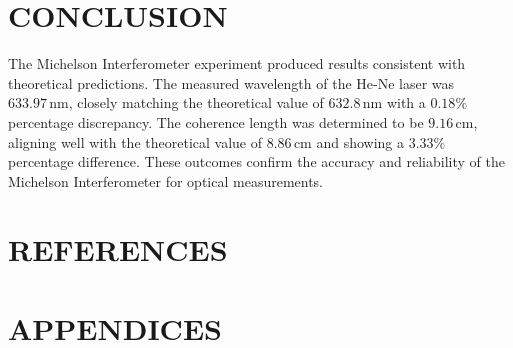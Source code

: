 \documentclass[a4paper,11pt]{article}
\begin{document}
\newpage
\section{\centering CONCLUSION}
\label{sec:CONCLUSION}
\indent 

The Michelson Interferometer experiment produced results consistent with theoretical predictions. The measured wavelength of the He-Ne laser was \( 633.97 \, \text{nm} \), closely matching the theoretical value of \( 632.8 \, \text{nm} \) with a \( 0.18\% \) percentage discrepancy. The coherence length was determined to be \( 9.16 \, \text{cm} \), aligning well with the theoretical value of \( 8.86 \, \text{cm} \) and showing a \( 3.33\% \) percentage difference. These outcomes confirm the accuracy and reliability of the Michelson Interferometer for optical measurements.

\newpage
\section{\centering REFERENCES}
\label{sec:REFERENCES}

\printbibliography[heading=none]

\newpage
\section{\centering APPENDICES}
\label{sec:APPENDICES}

\end{document}
